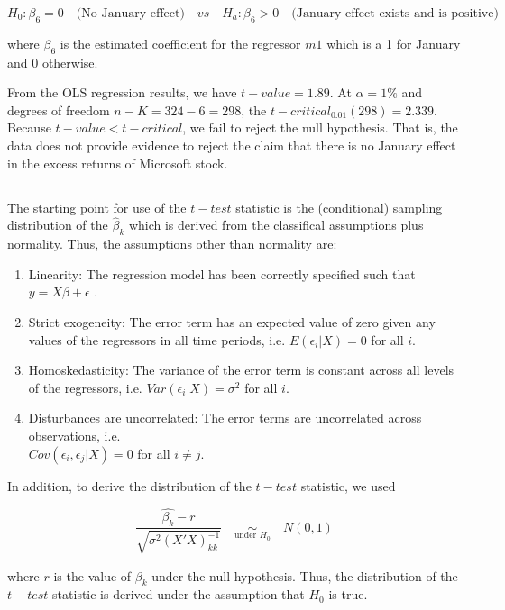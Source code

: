 $$
H_0: \beta_6 = 0 \quad \text{(No January effect)} \quad vs \quad
H_a: \beta_6 > 0 \quad \text{(January effect exists and is positive)}
$$

where $\beta_6$ is the estimated coefficient for the regressor $m1$ which is a 1 for January and 0 otherwise. 

\medskip 
\noindent
From the OLS regression results, we have $t-value = 1.89$. At $\alpha=1\%$ and degrees of freedom  $n-K = 324 - 6 = 298$, the $t-critical_{0.01}(298) = 2.339$. Because $t-value < t-critical$, we fail to reject the null hypothesis. That is, the data does not provide evidence to reject the claim that there is no January effect in the excess returns of Microsoft stock.

\subsection{}

The starting point for use of the $t-test$ statistic is the (conditional) sampling distribution of the $\hat{\beta}_k$ which is derived from the classifical assumptions plus normality. Thus, the assumptions other than normality are:

\begin{enumerate}[label=(A\arabic*)]
    \item Linearity: The regression model has been correctly specified such that $y = X\beta + \epsilon$ .
    \item Strict exogeneity: The error term has an expected value of zero given any values of the regressors in all time periods, i.e. $E(\epsilon_i | X) = 0$ for all $i$.
    \item Homoskedasticity: The variance of the error term is constant across all levels of the regressors, i.e. $Var(\epsilon_i | X) = \sigma^2$ for all $i$.
    \item Disturbances are uncorrelated: The error terms are uncorrelated across observations,
    i.e. \\ $Cov(\epsilon_i, \epsilon_j | X) = 0$ for all $i \neq j$.
\end{enumerate} 

\noindent
In addition, to derive the distribution of the $t-test$ statistic, we used 

$$\dfrac{\hat{\beta_k} - r}{\sqrt{\sigma^2(X'X)^{-1}_{kk}}} \quad \underset{\text{under }H_0}{\sim} \quad  N(0,1)$$

\noindent
where $r$ is the value of $\beta_k$ under the null hypothesis. Thus, the distribution of the $t-test$ statistic is derived under the assumption that $H_0$ is true.

